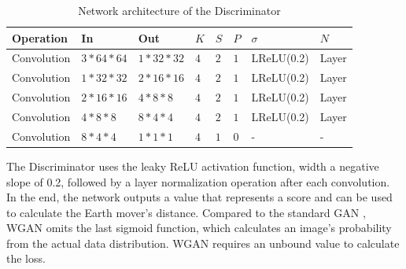 \begin{table}[H]
    \centering
    \begin{tabular}{@{}llllllll@{}}
        \toprule
        Operation   & In              & Out              & $ K $ & $ S $ & $ P $ & $ \sigma $ & $ N $ \\ \midrule
        Convolution & $ 3 * 64 * 64 $ & $ 1 * 32 * 32 $  & $ 4 $ & $ 2 $ & $ 1 $ & LReLU(0.2) & Layer \\
        Convolution & $ 1 * 32 * 32 $ & $ 2 * 16 * 16 $  & $ 4 $ & $ 2 $ & $ 1 $ & LReLU(0.2) & Layer \\
        Convolution & $ 2 * 16 * 16 $ & $ 4 * 8 * 8   $  & $ 4 $ & $ 2 $ & $ 1 $ & LReLU(0.2) & Layer \\
        Convolution & $ 4 * 8 * 8 $   & $ 8 * 4 * 4   $  & $ 4 $ & $ 2 $ & $ 1 $ & LReLU(0.2) & Layer \\
        Convolution & $ 8 * 4 * 4 $   & $ 1 * 1 * 1   $  & $ 4 $ & $ 1 $ & $ 0 $ & -          & -     \\ \bottomrule
    \end{tabular}
    \caption{Network architecture of the Discriminator}
    \label{tab:architecture-discriminator}
\end{table}

The Discriminator uses the leaky ReLU activation function,  width a negative slope of 0.2, followed by a layer normalization \cite{ba2016layernorm} operation after each convolution. In the end, the network outputs a value that represents a score and can be used to calculate the Earth mover's distance. Compared to the standard GAN \cite{goodfellow2014generative}, WGAN \cite{arjovsky2017wgan} omits the last sigmoid function, which calculates an image's probability from the actual data distribution. WGAN requires an unbound value to calculate the loss. \\



